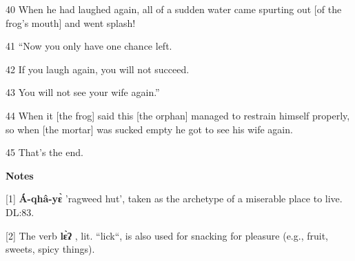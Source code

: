 {\LARGE{}40 When he had laughed again, all of a sudden water came spurting out
[of the frog's mouth] and went splash!}

{\LARGE{}41 ``Now you only have one chance left.}

{\LARGE{}42 If you laugh again, you will not succeed.}

{\LARGE{}43 You will not see your wife again.''}

{\LARGE{}44 When it [the frog] said this [the orphan] managed to restrain himself
properly, so when [the mortar] was sucked empty he got to see his wife again.}

{\LARGE{}45 That's the end.}

{\LARGE{}\textbf{Notes}}

{\LARGE{}[1] }{\textbf{Á-qhâ-yɛ̀}}{\LARGE{} 'ragweed hut', taken as
the archetype of a miserable place to live. DL:83.}

{\LARGE{}[2] The verb  }{\textbf{lɛ̀ʔ}}{\LARGE{}  , lit. ``lick``,
is also used for snacking for pleasure (e.g., fruit, sweets, spicy things).}


